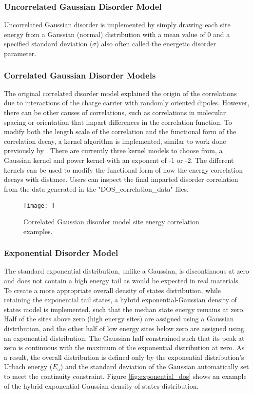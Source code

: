 \documentclass[%
 reprint,onecolumn,notitlepage,
superscriptaddress,longbibliography,
 amsmath,amssymb,
 aps,rmp,floatfix,
]{revtex4-1}
\begin{document}
\subsubsection{Uncorrelated Gaussian Disorder Model}

Uncorrelated Gaussian disorder is implemented by simply drawing each site energy from a Gaussian (normal) distribution with a mean value of 0 and a specified standard deviation ($\sigma$) also often called the energetic disorder parameter.

\subsubsection{Correlated Gaussian Disorder Models}

The original correlated disorder model explained the origin of the correlations due to interactions of the charge carrier with randomly oriented dipoles.
However, there can be other causes of correlations, such as correlations in molecular spacing or orientation that impart differences in the correlation function.\cite{kordt2014jctc}  
To modify both the length scale of the correlation and the functional form of the correlation decay, a kernel algorithm is implemented, similar to work done previously by \citeauthor{gartstein1995cpl}.\cite{gartstein1995cpl}
There are currently three kernel models to choose from, a Gaussian kernel and power kernel with an exponent of -1  or -2.
The different kernels can be used to modify the functional form of how the energy correlation decays with distance.
Users can inspect the final imparted disorder correlation from the data generated in the "DOS\_correlation\_data" files.

\begin{figure}[h]
    \centering
    \texttt{[image: ]}
    \caption{Correlated Gaussian disorder model site energy correlation examples.}
    \label{fig:correlation_data}
\end{figure}

\subsubsection{Exponential Disorder Model}

The standard exponential distribution, unlike a Gaussian, is discontinuous at zero and does not contain a high energy tail as would be expected in real materials.
To create a more appropriate overall density of states distribution, while retaining the exponential tail states, a hybrid exponential-Gaussian density of states model is implemented, such that the median state energy remains at zero.
Half of the sites above zero (high energy sites) are assigned using a Gaussian distribution, and the other half of low energy sites below zero are assigned using an exponential distribution.
The Gaussian half constrained such that its peak at zero is continuous with the maximum of the exponential distribution at zero.
As a result, the overall distribution is defined only by the exponential distribution's Urbach energy ($E_\text{u}$) and the standard deviation of the Gaussian automatically set to meet the continuity constraint.
Figure \ref{fig:exponential_dos} shows an example of the hybrid exponential-Gaussian density of states distribution.
\end{document}
